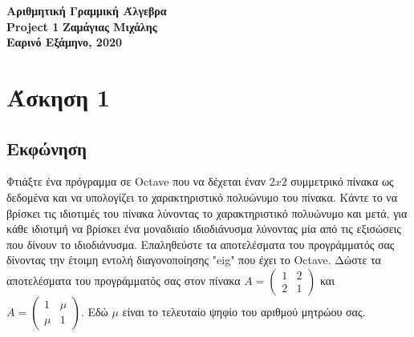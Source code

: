 \documentclass[a4paper,12pt]{article}
\begin{document}
\begin{titlepage}
	\begin{center}
		\vspace*{\fill}
		\huge{\textbf{Αριθμητική Γραμμική Άλγεβρα\\}}
		\vfill
		\huge{\textbf{Project 1}}
		\vspace*{\fill}
		\vfill
		\normalsize\textbf{Ζαμάγιας Μιχάλης\\}
		\small\textbf{Εαρινό Εξάμηνο, 2020\\}
		\vfill
	\end{center}
\end{titlepage}
\tableofcontents
\newpage
\section{Άσκηση 1}
\subsection{Εκφώνηση}
Φτιάξτε ένα πρόγραμμα σε Octave που να δέχεται έναν ${2x2}$ συμμετρικό πίνακα
ως δεδομένα και να υπολογίζει το χαρακτηριστικό πολυώνυμο του πίνακα. Κάντε το
να βρίσκει τις ιδιοτιμές του πίνακα λύνοντας το χαρακτηριστικό πολυώνυμο και
μετά, για κάθε ιδιοτιμή να βρίσκει ένα μοναδιαίο ιδιοδιάνυσμα λύνοντας μία
από τις εξισώσεις που δίνουν το ιδιοδιάνυσμα. Επαληθεύστε τα αποτελέσματα
του προγράμματός σας δίνοντας την έτοιμη εντολή διαγονοποίησης "eig" που έχει
το Octave. Δώστε τα αποτελέσματα του προγράμματός σας στον πίνακα $
	A=\begin{pmatrix}
		1 & 2 \\
		2 & 1
	\end{pmatrix}
$ και $
	A=\begin{pmatrix}
		1   & \mu \\
		\mu & 1
	\end{pmatrix}
$. Εδώ ${\mu}$ είναι το τελευταίο ψηφίο του αριθμού μητρώου σας.
\end{document}
